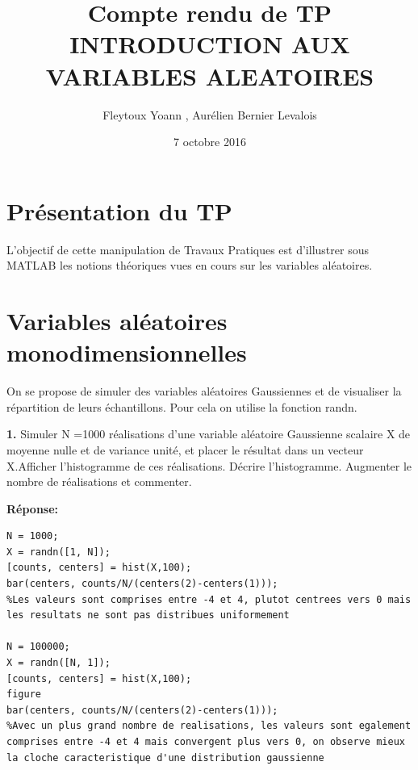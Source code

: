 \documentclass[12pt]{article}
\title{Compte rendu de TP\\ \textbf{INTRODUCTION AUX VARIABLES ALEATOIRES}}
\author{Fleytoux Yoann , Aurélien Bernier Levalois}
\date{7 octobre 2016}
\begin{document}
\maketitle



\tableofcontents
\vspace{0.6cm}


\section{Présentation du TP}

L'objectif de cette manipulation de Travaux Pratiques est d'illustrer sous MATLAB les notions théoriques vues en cours sur les variables aléatoires.


\section{Variables aléatoires monodimensionnelles}
On se propose de simuler des variables aléatoires Gaussiennes et de visualiser la répartition de leurs échantillons. Pour cela on utilise la fonction randn.
\smallbreak

\textbf{1. }Simuler N =1000 réalisations d'une variable aléatoire Gaussienne scalaire X de moyenne nulle et de variance unité, et placer le résultat dans un vecteur X.Afficher l'histogramme de ces réalisations.
Décrire l'histogramme. Augmenter le nombre de réalisations et commenter.

\smallbreak
\textbf{Réponse:}
\begin{lstlisting}[style=Matlab-editor]
N = 1000;
X = randn([1, N]);
[counts, centers] = hist(X,100);
bar(centers, counts/N/(centers(2)-centers(1)));
%Les valeurs sont comprises entre -4 et 4, plutot centrees vers 0 mais les resultats ne sont pas distribues uniformement

N = 100000;
X = randn([N, 1]);
[counts, centers] = hist(X,100);
figure
bar(centers, counts/N/(centers(2)-centers(1)));
%Avec un plus grand nombre de realisations, les valeurs sont egalement comprises entre -4 et 4 mais convergent plus vers 0, on observe mieux la cloche caracteristique d'une distribution gaussienne
\end{lstlisting}
\end{document}
